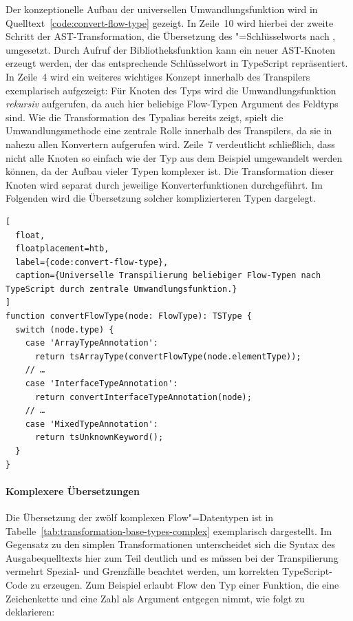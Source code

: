 Der konzeptionelle Aufbau der universellen Umwandlungsfunktion  wird in Quelltext~\ref{code:convert-flow-type} gezeigt. In Zeile~10 wird hierbei der zweite Schritt der AST-Transformation, die Übersetzung des "=Schlüsselworts nach , umgesetzt. Durch Aufruf der Bibliotheksfunktion  kann ein neuer AST-Knoten erzeugt werden, der das entsprechende Schlüsselwort in TypeScript repräsentiert.
In Zeile~4 wird ein weiteres wichtiges Konzept innerhalb des Transpilers exemplarisch aufgezeigt: Für Knoten des Typs  wird die Umwandlungsfunktion \emph{rekursiv} aufgerufen, da auch hier beliebige Flow-Typen Argument des Feldtyps sind. Wie die Transformation des Typalias bereits zeigt, spielt die Umwandlungsmethode  eine zentrale Rolle innerhalb des Transpilers, da sie in nahezu allen Konvertern aufgerufen wird. Zeile~7 verdeutlicht schließlich, dass nicht alle Knoten so einfach wie der Typ  aus dem Beispiel umgewandelt werden können, da der Aufbau vieler Typen komplexer ist. Die Transformation dieser Knoten wird separat durch jeweilige Konverterfunktionen durchgeführt. Im Folgenden wird die Übersetzung solcher komplizierteren Typen dargelegt.

\begin{lstlisting}[
  float,
  floatplacement=htb,
  label={code:convert-flow-type},
  caption={Universelle Transpilierung beliebiger Flow-Typen nach TypeScript durch zentrale Umwandlungsfunktion.}
]
function convertFlowType(node: FlowType): TSType {
  switch (node.type) {
    case 'ArrayTypeAnnotation':
      return tsArrayType(convertFlowType(node.elementType));
    // …
    case 'InterfaceTypeAnnotation':
      return convertInterfaceTypeAnnotation(node);
    // …
    case 'MixedTypeAnnotation':
      return tsUnknownKeyword();
  }
}
\end{lstlisting}

\paragraph{Komplexere Übersetzungen}

Die Übersetzung der zwölf komplexen Flow"=Datentypen ist in Tabelle~\ref{tab:transformation-base-types-complex} exemplarisch dargestellt. Im Gegensatz zu den simplen Transformationen unterscheidet sich die Syntax des Ausgabequelltexts hier zum Teil deutlich und es müssen bei der Transpilierung vermehrt Spezial- und Grenzfälle beachtet werden, um korrekten TypeScript-Code zu erzeugen. Zum Beispiel erlaubt Flow den Typ einer Funktion, die eine Zeichenkette und eine Zahl als Argument entgegen nimmt, wie folgt zu deklarieren:

